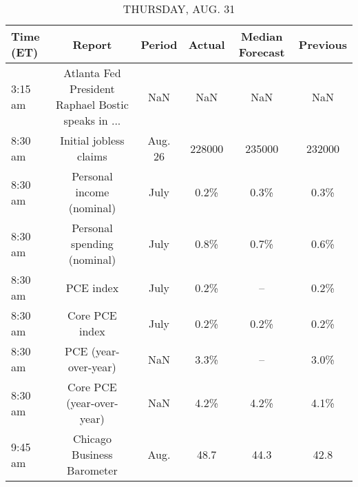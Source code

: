 \documentclass{article}%
\begin{document}
\begin{table}[htbp]%
\caption{THURSDAY, AUG. 31}%
\centering%
\begin{adjustbox}{width=1\textwidth}%
\begin{tabular}{lccccc}
\toprule
Time (ET) &                                             Report &  Period & Actual & Median Forecast & Previous \\
\midrule
  3:15 am & Atlanta Fed President Raphael Bostic speaks in ... &     NaN &    NaN &             NaN &      NaN \\
  8:30 am &                             Initial jobless claims & Aug. 26 & 228000 &          235000 &   232000 \\
  8:30 am &                          Personal income (nominal) &    July &   0.2\% &            0.3\% &     0.3\% \\
  8:30 am &                        Personal spending (nominal) &    July &   0.8\% &            0.7\% &     0.6\% \\
  8:30 am &                                          PCE index &    July &   0.2\% &              -- &     0.2\% \\
  8:30 am &                                     Core PCE index &    July &   0.2\% &            0.2\% &     0.2\% \\
  8:30 am &                               PCE (year-over-year) &     NaN &   3.3\% &              -- &     3.0\% \\
  8:30 am &                          Core PCE (year-over-year) &     NaN &   4.2\% &            4.2\% &     4.1\% \\
  9:45 am &                         Chicago Business Barometer &    Aug. &   48.7 &            44.3 &     42.8 \\
\bottomrule
\end{tabular}
%
\end{adjustbox}%
\end{table}

%
\end{document}

